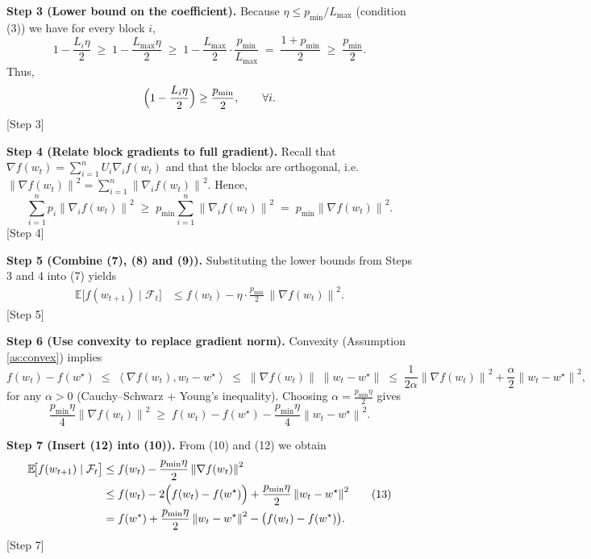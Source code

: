 \documentclass[11pt]{article}
\newcommand{\E}{\mathbb{E}}
\newcommand{\norm}[1]{\left\|#1\right\|}
\newcommand{\inner}[2]{\left\langle #1,#2 \right\rangle}
\begin{document}
\bigskip
\noindent\textbf{Step 3 (Lower bound on the coefficient).}  
Because $\eta\le p_{\min}/L_{\max}$ (condition (3)) we have for every block $i$,
\[
1-\frac{L_i\eta}{2}\;\ge\;1-\frac{L_{\max}\eta}{2}
\;\ge\;1-\frac{L_{\max}}{2}\cdot\frac{p_{\min}}{L_{\max}}
\;=\;\frac{1+p_{\min}}{2}\;\ge\;\frac{p_{\min}}{2}.
\tag{8}
\]
Thus,
\[
\Bigl(1-\frac{L_i\eta}{2}\Bigr)\ge \frac{p_{\min}}{2},\qquad\forall i .
\]
\hfill[Step 3]

\bigskip
\noindent\textbf{Step 4 (Relate block gradients to full gradient).}  
Recall that $\nabla f(w_t)=\sum_{i=1}^{n}U_i\nabla_i f(w_t)$ and that the blocks are orthogonal, i.e.
$\norm{\nabla f(w_t)}^{2}= \sum_{i=1}^{n}\norm{\nabla_i f(w_t)}^{2}$.
Hence,
\[
\sum_{i=1}^{n}p_i\norm{\nabla_i f(w_t)}^{2}
\;\ge\;p_{\min}\sum_{i=1}^{n}\norm{\nabla_i f(w_t)}^{2}
\;=\;p_{\min}\norm{\nabla f(w_t)}^{2}.
\tag{9}
\]
\hfill[Step 4]

\bigskip
\noindent\textbf{Step 5 (Combine (7), (8) and (9)).}  
Substituting the lower bounds from Steps 3 and 4 into (7) yields
\[
\begin{aligned}
\E\!\bigl[f(w_{t+1})\mid\mathcal{F}_t\bigr]
&\le f(w_t)-\eta\cdot\frac{p_{\min}}{2}\,
       \norm{\nabla f(w_t)}^{2}.
\end{aligned}
\tag{10}
\]
\hfill[Step 5]

\bigskip
\noindent\textbf{Step 6 (Use convexity to replace gradient norm).}  
Convexity (Assumption \ref{as:convex}) implies
\[
f(w_t)-f(w^\star) \;\le\; \inner{\nabla f(w_t)}{w_t-w^\star}
 \;\le\; \norm{\nabla f(w_t)}\;\norm{w_t-w^\star}
 \;\le\; \frac{1}{2\alpha}\norm{\nabla f(w_t)}^{2}
          +\frac{\alpha}{2}\norm{w_t-w^\star}^{2},
\tag{11}
\]
for any $\alpha>0$ (Cauchy–Schwarz + Young’s inequality). Choosing $\alpha = \frac{p_{\min}\eta}{2}$ gives
\[
\frac{p_{\min}\eta}{4}\norm{\nabla f(w_t)}^{2}
\;\ge\; f(w_t)-f(w^\star)-\frac{p_{\min}\eta}{4}\norm{w_t-w^\star}^{2}.
\tag{12}
\]

\bigskip
\noindent\textbf{Step 7 (Insert (12) into (10)).}  
From (10) and (12) we obtain
\[
\begin{aligned}
\E\!\bigl[f(w_{t+1})\mid\mathcal{F}_t\bigr]
&\le f(w_t)-\frac{p_{\min}\eta}{2}\norm{\nabla f(w_t)}^{2}               \\
&\le f(w_t)-2\Bigl(f(w_t)-f(w^\star)\Bigr)
      +\frac{p_{\min}\eta}{2}\norm{w_t-w^\star}^{2}                       \\
&= f(w^\star)+\frac{p_{\min}\eta}{2}\norm{w_t-w^\star}^{2}
      -\bigl(f(w_t)-f(w^\star)\bigr) .
\end{aligned}
\tag{13}
\]
\hfill[Step 7]
\end{document}
